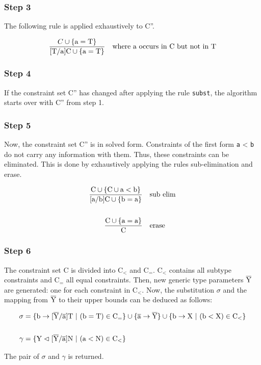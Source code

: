 \subsubsection{Step 3}
The following rule is applied exhaustively to C''.

\begin{align*}
    \frac{C \cup \{ \text{a} = \text{T} \}}{ \text{[T/a]C} \cup \{ \text{a} = \text{T} \} } \quad \text{where a occurs in C but not in T}
\end{align*}

\subsubsection{Step 4}
If the constraint set C'' has changed after applying the rule \verb|subst|, the algorithm starts over with C'' from step 1.

\subsubsection{Step 5}
Now, the constraint set C'' is in solved form. Constraints of the first form \verb|a| < \verb|b| do not carry any information with them. Thus, these constraints can be eliminated.
This is done by exhaustively applying the rules sub-elimination and erase.

\begin{align*}
    \frac{\text{C} \cup \{ \text{C} \cup \text{a} < \text{b} \}}{ \text{[a/b]C} \cup \{ \text{b} = \text{a} \} } \quad &\text{sub elim}
    \\
    \\
    \frac{\text{C} \cup \{ \text{a} = \text{a} \} }{ \text{C} } \quad &\text{erase}
\end{align*}

\subsubsection{Step 6}
The constraint set C is divided into $\text{C}_<$ and $\text{C}_=$. $\text{C}_<$ contains all subtype constraints and $\text{C}_=$ all equal constraints.
Then, new generic type parameters $\overline{\text{Y}}$ are generated: one for each constraint in $\text{C}_<$. Now, the substitution $\sigma$ and the mapping from $\overline{\text{Y}}$ to their upper bounds can be deduced as follows:

\begin{align*}
    \sigma &= \{ \text{b} \to \tsxsn{Y}{a}{T} \ | \ (\text{b} = \text{T}) \in \text{C}_= \} \cup \{ \ot{a} \to \ot{Y} \} \cup \{ \text{b} \to \text{X} \ | \ (\text{b} < \text{X}) \in \text{C}_< \}\\
    \\
    \gamma &= \{ \text{Y} \vartriangleleft \tsxsn{Y}{a}{N} \ | \ (\text{a} < \text{N}) \in \text{C}_< \}\\
\end{align*}

The pair of $\sigma$ and $\gamma$ is returned.

